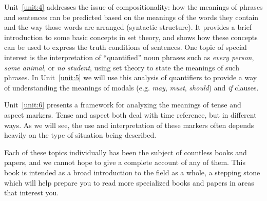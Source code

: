Unit~\ref{unit:4} addresses the issue of compositionality: how the meanings of phrases and sentences can be predicted based on the meanings of the words they contain and the way those words are arranged (syntactic structure). It provides a brief introduction to some basic concepts in set theory, and shows how these concepts can be used to express the truth conditions of sentences. One topic of special interest is the interpretation of “quantified” noun phrases such as \textit{every person}, \textit{some animal}, or \textit{no student}, using set theory to state the meanings of such phrases. In Unit~\ref{unit:5} we will use this analysis of quantifiers to provide a way of understanding the meanings of modals (e.g. \textit{may}, \textit{must}, \textit{should}) and \textit{if} clauses.



Unit~\ref{unit:6} presents a framework for analyzing the meanings of tense and aspect markers. Tense and aspect both deal with time reference, but in different ways. As we will see, the use and interpretation of these markers often depends heavily on the type of situation being described.


\largerpage 
Each of these topics individually has been the subject of countless books and papers, and we cannot hope to give a complete account of any of them. This book is intended as a broad introduction to the field as a whole, a stepping stone which will help prepare you to read more specialized books and papers in areas that interest you.



